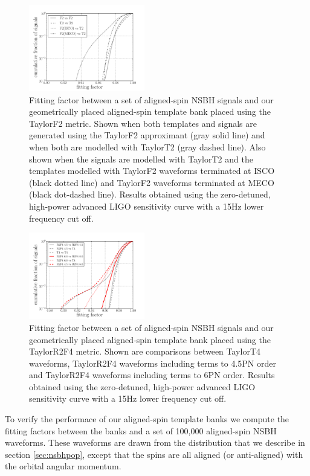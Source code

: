 \begin{figure}
\includegraphics[width=0.45\textwidth]
{papers/nsbh_effectualness/figure3.pdf}
\caption{\label{fig:bankF2verification}
Fitting factor between a set of aligned-spin \ac{NSBH} signals and our
geometrically placed aligned-spin template bank placed using the TaylorF2
metric. Shown when both templates and signals are generated using
the TaylorF2 approximant (gray solid line) and when both are modelled with
TaylorT2 (gray
dashed line). Also shown when the signals are modelled with TaylorT2 and the
templates modelled
with TaylorF2 waveforms terminated at ISCO (black dotted line) and TaylorF2
waveforms terminated at MECO (black dot-dashed line). Results obtained
using the zero-detuned, high-power advanced LIGO sensitivity curve with a 15Hz
lower frequency cut off.
}
\end{figure}

\begin{figure}
\includegraphics[width=0.45\textwidth]
{papers/nsbh_effectualness/figure4.pdf}
\caption{\label{fig:bankF4verification}
Fitting factor between a set of aligned-spin \ac{NSBH} signals and our
geometrically placed aligned-spin template bank placed using the TaylorR2F4
metric. Shown are comparisons between
TaylorT4 waveforms, TaylorR2F4 waveforms
including terms to 4.5PN order and TaylorR2F4 waveforms including terms to 6PN
order. Results obtained
using the zero-detuned, high-power advanced LIGO sensitivity curve with a 15Hz
lower frequency cut off.
}
\end{figure}

To verify the performace of our aligned-spin template banks we compute the
fitting factors between the banks and a set of 100,000 aligned-spin \ac{NSBH}
waveforms. These waveforms are drawn from the
distribution that we describe in section \ref{sec:nsbhpop}, except that the
spins are all aligned (or anti-aligned) with the orbital angular momentum.

